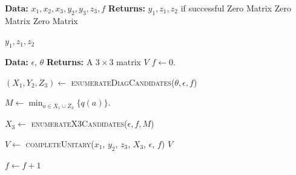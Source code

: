 \documentclass[12pt]{amsart}
\theoremstyle{definition}
\begin{document}
	\begin{algorithm}[H]
		\caption{Find Entries Above Diagonal} 
		\begin{algorithmic}[1]
			\State \textbf{Data:} $x_1, x_2, x_3, y_2, y_3, z_3, f$
			\State \textbf{Returns:}  $y_1, z_1, z_2$ if successful
			\Else 
				\State \Return Zero Matrix
			\EndIf
			\Else 
				\State \Return Zero Matrix
			\EndIf
			\Else
				\State \Return Zero Matrix
			\EndIf
			
			\State \Return $y_1, z_1, z_2$
			
			\EndProcedure
		\end{algorithmic} 
	\end{algorithm}
	
	\begin{algorithm}[H]
		\caption{Exhaustive Search Algorithm} 
		\begin{algorithmic}[1]
			\State \textbf{Data:} $\epsilon$, $\theta$
			\State \textbf{Returns:}  A $3 \times 3$ matrix $V$
			\State $f \gets 0$.
			
			
			\State $(X_1, Y_2, Z_3) \gets $ \textsc{enumerateDiagCandidates}($\theta, \epsilon, f$)
			
			\State $M \gets \min_{a \in X_1 \cup Z_3}\{q(a)\}$.
			
			\State $X_3 \gets $ \textsc{enumerateX3Candidates}($\epsilon, f, M$)
			
			\State $V \gets $ \textsc{completeUnitary}($x_1$, $y_2$, $z_3$, $X_3$, $\epsilon$, $f$)
			\State \Return $V$
			\EndIf
			\EndFor
			
			\State $f \gets f + 1$
			\EndFor
			\EndProcedure
		\end{algorithmic} 
	\end{algorithm}
\end{document}
